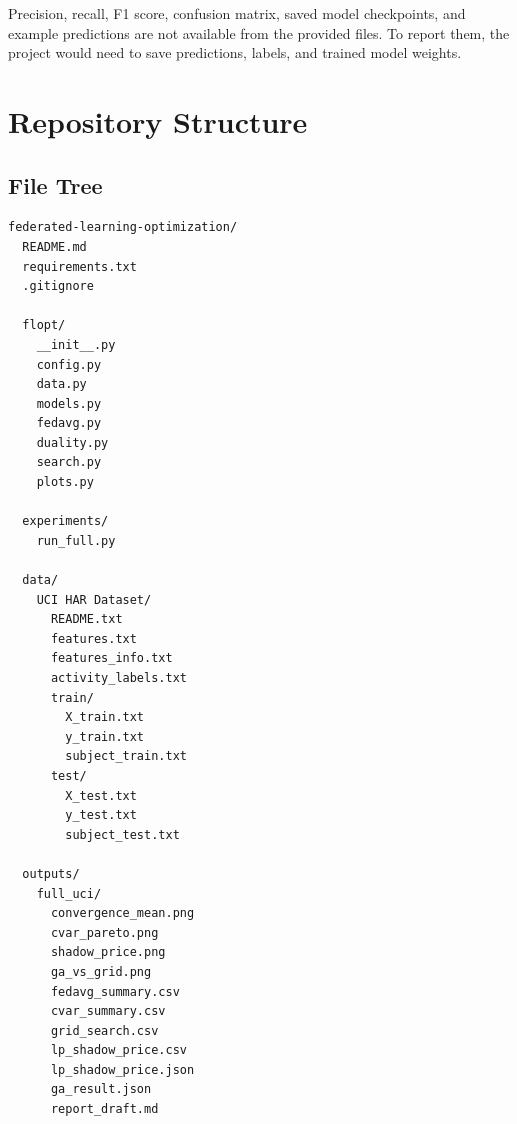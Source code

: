 \documentclass{article}
\begin{document}
Precision, recall, F1 score, confusion matrix, saved model checkpoints, and example predictions are not available from the provided files. To report them, the project would need to save predictions, labels, and trained model weights.

\section{Repository Structure}

\subsection{File Tree}
\begin{lstlisting}[style=textstyle]
federated-learning-optimization/
  README.md
  requirements.txt
  .gitignore

  flopt/
    __init__.py
    config.py
    data.py
    models.py
    fedavg.py
    duality.py
    search.py
    plots.py

  experiments/
    run_full.py

  data/
    UCI HAR Dataset/
      README.txt
      features.txt
      features_info.txt
      activity_labels.txt
      train/
        X_train.txt
        y_train.txt
        subject_train.txt
      test/
        X_test.txt
        y_test.txt
        subject_test.txt

  outputs/
    full_uci/
      convergence_mean.png
      cvar_pareto.png
      shadow_price.png
      ga_vs_grid.png
      fedavg_summary.csv
      cvar_summary.csv
      grid_search.csv
      lp_shadow_price.csv
      lp_shadow_price.json
      ga_result.json
      report_draft.md
\end{lstlisting}
\end{document}
